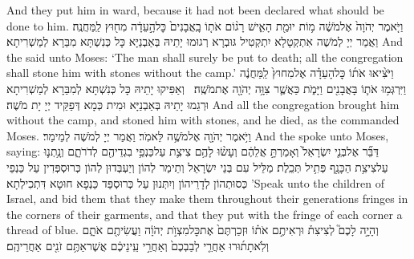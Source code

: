 {And they put him in ward, because it had not been declared what should be done to him.}{}
{וַיֹּ֤אמֶר יְהֹוָה֙ אֶל\maqqaf מֹשֶׁ֔ה מ֥וֹת יוּמַ֖ת הָאִ֑ישׁ רָג֨וֹם אֹת֤וֹ בָֽאֲבָנִים֙ כׇּל\maqqaf הָ֣עֵדָ֔ה מִח֖וּץ לַֽמַּחֲנֶֽה׃}
{וַאֲמַר יְיָ לְמֹשֶׁה אִתְקְטָלָא יִתְקְטִיל גּוּבְרָא רְגוּמוּ יָתֵיהּ בְּאַבְנַיָּא כָּל כְּנִשְׁתָּא מִבַּרָא לְמַשְׁרִיתָא׃}
{And the \lord\space said unto Moses: ‘The man shall surely be put to death; all the congregation shall stone him with stones without the camp.’}{}
{וַיֹּצִ֨יאוּ אֹת֜וֹ כׇּל\maqqaf הָעֵדָ֗ה אֶל\maqqaf מִחוּץ֙ לַֽמַּחֲנֶ֔ה וַיִּרְגְּמ֥וּ אֹת֛וֹ בָּאֲבָנִ֖ים וַיָּמֹ֑ת כַּאֲשֶׁ֛ר צִוָּ֥ה יְהֹוָ֖ה אֶת\maqqaf מֹשֶֽׁה׃ \petucha }
{וְאַפִּיקוּ יָתֵיהּ כָּל כְּנִשְׁתָּא לְמִבַּרָא לְמַשְׁרִיתָא וּרְגַמוּ יָתֵיהּ בְּאַבְנַיָּא וּמִית כְּמָא דְּפַקֵּיד יְיָ יָת מֹשֶׁה׃}
{And all the congregation brought him without the camp, and stoned him with stones, and he died, as the \lord\space commanded Moses.}{}
{וַיֹּ֥אמֶר יְהֹוָ֖ה אֶל\maqqaf מֹשֶׁ֥ה לֵּאמֹֽר׃}
{וַאֲמַר יְיָ לְמֹשֶׁה לְמֵימַר׃}
{And the \lord\space spoke unto Moses, saying:}{}
{דַּבֵּ֞ר אֶל\maqqaf בְּנֵ֤י יִשְׂרָאֵל֙ וְאָמַרְתָּ֣ אֲלֵהֶ֔ם וְעָשׂ֨וּ לָהֶ֥ם צִיצִ֛ת עַל\maqqaf כַּנְפֵ֥י בִגְדֵיהֶ֖ם לְדֹרֹתָ֑ם וְנָ֥תְנ֛וּ עַל\maqqaf צִיצִ֥ת הַכָּנָ֖ף פְּתִ֥יל תְּכֵֽלֶת׃}
{מַלֵּיל עִם בְּנֵי יִשְׂרָאֵל וְתֵימַר לְהוֹן וְיַעְבְּדוּן לְהוֹן כְּרוּסְפְּדִין עַל כַּנְפֵי כְּסוּתְהוֹן לְדָרֵיהוֹן וְיִתְּנוּן עַל כְּרוּסְפַּד כַּנְפָא חוּטָא דִּתְכִילְתָא׃}
{’Speak unto the children of Israel, and bid them that they make them throughout their generations fringes in the corners of their garments, and that they put with the fringe of each corner a thread of blue.}{}
{וְהָיָ֣ה לָכֶם֮ לְצִיצִת֒ וּרְאִיתֶ֣ם אֹת֗וֹ וּזְכַרְתֶּם֙ אֶת\maqqaf כׇּל\maqqaf מִצְוֺ֣ת יְהֹוָ֔ה וַעֲשִׂיתֶ֖ם אֹתָ֑ם וְלֹֽא\maqqaf תָת֜וּרוּ אַחֲרֵ֤י לְבַבְכֶם֙ וְאַחֲרֵ֣י עֵֽינֵיכֶ֔ם אֲשֶׁר\maqqaf אַתֶּ֥ם זֹנִ֖ים אַחֲרֵיהֶֽם׃}
